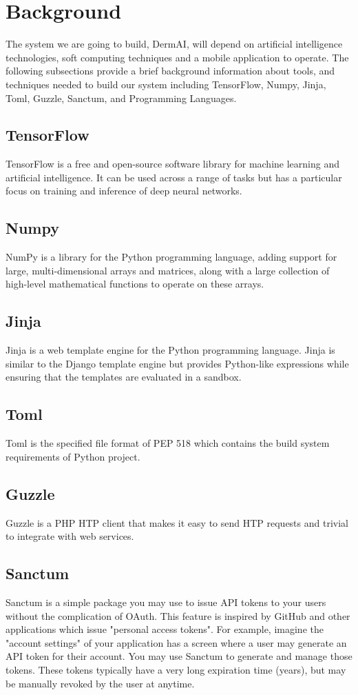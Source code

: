 \documentclass{article}
\begin{document}
\section{Background}
The system we are going to build, DermAI, will depend on artificial intelligence technologies, soft computing techniques and a mobile application to operate. The following subsections provide a brief background information about tools, and techniques needed to build our system including TensorFlow, Numpy, Jinja, Toml, Guzzle, Sanctum, and Programming Languages.

\subsection{TensorFlow}
TensorFlow is a free and open-source software library for machine learning and artificial intelligence. It can be used across a range of tasks but has a particular focus on training and inference of deep neural networks.

\subsection{Numpy}
NumPy is a library for the Python programming language, adding support for large, multi-dimensional arrays and matrices, along with a large collection of high-level mathematical functions to operate on these arrays.

\subsection{Jinja}
Jinja is a web template engine for the Python programming language. Jinja is similar to the Django template engine but provides Python-like expressions while ensuring that the templates are evaluated in a sandbox.

\subsection{Toml}
Toml is the specified file format of PEP 518 which contains the build system requirements of Python project.

\subsection{Guzzle}
Guzzle is a PHP HTP client that makes it easy to send HTP requests and trivial to integrate with web services.

\subsection{Sanctum}
Sanctum is a simple package you may use to issue API tokens to your users without the complication of OAuth. This feature is inspired by GitHub and other applications which issue "personal access tokens". For example, imagine the "account settings" of your application has a screen where a user may generate an API token for their account. You may use Sanctum to generate and manage those tokens. These tokens typically have a very long expiration time (years), but may be manually revoked by the user at anytime.
\end{document}
